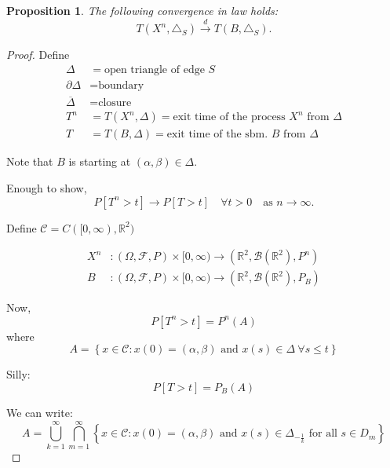 \documentclass[11pt, a4paper, oneside]{report}
\numberwithin{equation}{section}
\newtheorem{proposition}[theorem]{Proposition}
\begin{document}
\begin{proposition}\label{exit-time-convergence}\cite[Proposition 3]{research}
The following convergence in law holds:  
\[
T(X^n, \triangle_S) \xrightarrow{d} T(B, \triangle_S).
\]
\end{proposition}
\begin{proof}
Define
\begin{align*}
    \Delta &= \text{open triangle of edge } S \\
    \partial \Delta &= \text{boundary} \\
    \overline{\Delta} &= \text{closure} \\
    T^n &= T(X^n, \Delta) = \text{exit time of the process } X^n \text{ from } \Delta \\
    T &= T(B, \Delta) = \text{exit time of the sbm. } B \text{ from } \Delta
\end{align*}

Note that $B$ is starting at $(\alpha, \beta) \in \Delta$.

Enough to show,
\[
P[T^n > t] \longrightarrow P[T > t] \quad \forall t > 0 \quad \text{as } n \to \infty.
\]

Define \(\mathcal{C} = C([0, \infty), \mathbb{R}^2)\)

\begin{align*}
    X^n &\colon (\Omega, \mathcal{F},P) \times [0, \infty) \longrightarrow (\mathbb{R}^2, \mathcal{B}(\mathbb{R}^2), P^n) \\
    B &\colon (\Omega, \mathcal{F},P) \times [0, \infty) \longrightarrow (\mathbb{R}^2, \mathcal{B}(\mathbb{R}^2), P_B)
\end{align*}

Now,
\[
P[T^n > t] = P^{n} (A)
\]
where
\[
A = \left\{ x \in \mathcal{C} \colon x(0) = (\alpha, \beta) \text{ and } x(s) \in \Delta \ \forall s \le t \right\}
\]

Silly:
\[
P[T > t] = P_B(A)
\]

We can write:
\[
A = \bigcup_{k=1}^\infty \bigcap_{m=1}^\infty \left\{ x \in \mathcal{C} \colon x(0) = (\alpha, \beta) \text{ and } x(s) \in \Delta_{-\frac{1}{k}}\text{ for all } s \in D_m \right\}
\]


\end{proof}
\end{document}
